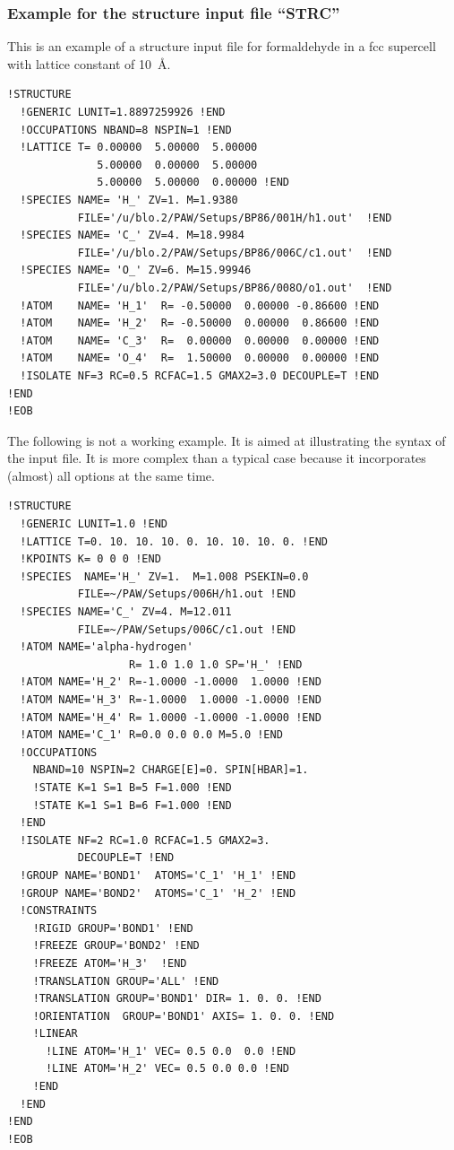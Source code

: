 \documentclass[final,12pt]{article}
\begin{document}
\subsubsection{Example for the structure input file ``STRC''}
This is an example of a structure input file for formaldehyde in a fcc
supercell with lattice constant of 10~\AA.
\begin{verbatim}
!STRUCTURE
  !GENERIC LUNIT=1.8897259926 !END   
  !OCCUPATIONS NBAND=8 NSPIN=1 !END
  !LATTICE T= 0.00000  5.00000  5.00000               
              5.00000  0.00000  5.00000               
              5.00000  5.00000  0.00000 !END
  !SPECIES NAME= 'H_' ZV=1. M=1.9380 
           FILE='/u/blo.2/PAW/Setups/BP86/001H/h1.out'  !END 
  !SPECIES NAME= 'C_' ZV=4. M=18.9984 
           FILE='/u/blo.2/PAW/Setups/BP86/006C/c1.out'  !END 
  !SPECIES NAME= 'O_' ZV=6. M=15.99946 
           FILE='/u/blo.2/PAW/Setups/BP86/008O/o1.out'  !END 
  !ATOM    NAME= 'H_1'  R= -0.50000  0.00000 -0.86600 !END
  !ATOM    NAME= 'H_2'  R= -0.50000  0.00000  0.86600 !END
  !ATOM    NAME= 'C_3'  R=  0.00000  0.00000  0.00000 !END
  !ATOM    NAME= 'O_4'  R=  1.50000  0.00000  0.00000 !END
  !ISOLATE NF=3 RC=0.5 RCFAC=1.5 GMAX2=3.0 DECOUPLE=T !END 
!END 
!EOB 
\end{verbatim}
The following is not a working example. It is aimed at illustrating
the syntax of the input file. It is more complex than a typical case
because it incorporates (almost) all options at the same time.
\begin{verbatim}
!STRUCTURE 
  !GENERIC LUNIT=1.0 !END 
  !LATTICE T=0. 10. 10. 10. 0. 10. 10. 10. 0. !END 
  !KPOINTS K= 0 0 0 !END 
  !SPECIES  NAME='H_' ZV=1.  M=1.008 PSEKIN=0.0
           FILE=~/PAW/Setups/006H/h1.out !END 
  !SPECIES NAME='C_' ZV=4. M=12.011 
           FILE=~/PAW/Setups/006C/c1.out !END 
  !ATOM NAME='alpha-hydrogen' 
                   R= 1.0 1.0 1.0 SP='H_' !END 
  !ATOM NAME='H_2' R=-1.0000 -1.0000  1.0000 !END 
  !ATOM NAME='H_3' R=-1.0000  1.0000 -1.0000 !END 
  !ATOM NAME='H_4' R= 1.0000 -1.0000 -1.0000 !END 
  !ATOM NAME='C_1' R=0.0 0.0 0.0 M=5.0 !END
  !OCCUPATIONS 
    NBAND=10 NSPIN=2 CHARGE[E]=0. SPIN[HBAR]=1. 
    !STATE K=1 S=1 B=5 F=1.000 !END 
    !STATE K=1 S=1 B=6 F=1.000 !END 
  !END
  !ISOLATE NF=2 RC=1.0 RCFAC=1.5 GMAX2=3. 
           DECOUPLE=T !END 
  !GROUP NAME='BOND1'  ATOMS='C_1' 'H_1' !END 
  !GROUP NAME='BOND2'  ATOMS='C_1' 'H_2' !END 
  !CONSTRAINTS
    !RIGID GROUP='BOND1' !END 
    !FREEZE GROUP='BOND2' !END 
    !FREEZE ATOM='H_3'  !END 
    !TRANSLATION GROUP='ALL' !END
    !TRANSLATION GROUP='BOND1' DIR= 1. 0. 0. !END
    !ORIENTATION  GROUP='BOND1' AXIS= 1. 0. 0. !END
    !LINEAR 
      !LINE ATOM='H_1' VEC= 0.5 0.0  0.0 !END 
      !LINE ATOM='H_2' VEC= 0.5 0.0 0.0 !END 
    !END 
  !END
!END 
!EOB
\end{verbatim}
\end{document}
